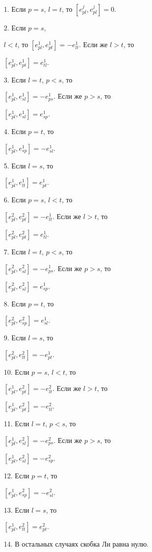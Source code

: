 \begin{itemize}


\item[1.] Если $p=s$, $l=t$, то $[e_{pl}^j,e_{pl}^j]=0$.


\item[2.] Если $p=s$,


$l<t$, то $[e_{pl}^1,e_{pt}^1]= -e_{lt}^1$. Если же $l>t$, то


$[e_{pl}^1,e_{pt}^1]=e_{tl}^1$.


\item[3.]  Если $l=t$, $p<s$, то


$[e_{pl}^1,e_{sl}^1]=-e_{ps}^1$. Если же  $p>s$, то


$[e_{pl}^1,e_{sl}^1]=e_{sp}^1$. 


\item[4.] Если $p=t$, то


$[e_{pl}^1,e_{sp}^1]=-e_{sl}^1$.


\item[5.] Если $l=s$, то


$[e_{pl}^1,e_{lt}^1]= e_{pt}^1$.


\item[6.] Если $p=s$, $l<t$, то


$[e_{pl}^2,e_{pt}^2]= -e_{lt}^1$. Если же $l>t$, то


$[e_{pl}^2,e_{pt}^2]=e_{tl}^1$.


\item[7.] Если $l=t$, $p<s$, то


$[e_{pl}^2,e_{sl}^2]=-e_{ps}^1$. Если же  $p>s$, то


$[e_{pl}^2,e_{sl}^2]=e_{sp}^1$.


\item[8.] Если $p=t$, то


$[e_{pl}^2,e_{sp}^2]=e_{sl}^1$.


\item[9.] Если $l=s$, то


$[e_{pl}^2,e_{lt}^2]= -e_{pt}^1$.


\item[10.] Если $p=s$, $l<t$, то


$[e_{pl}^1,e_{pt}^2]= -e_{lt}^2$. Если же $l>t$, то


$[e_{pl}^1,e_{pt}^2]=-e_{tl}^2$.


\item[11.] Если $l=t$, $p<s$, то


$[e_{pl}^1,e_{sl}^2]=-e_{ps}^2$. Если же  $p>s$, то


$[e_{pl}^1,e_{sl}^2]=-e_{sp}^2$.


\item[12.] Если $p=t$, то


$[e_{pl}^1,e_{sp}^2]=-e_{sl}^2$.


\item[13.] Если $l=s$, то


$[e_{pl}^1,e_{lt}^2]= e_{pt}^2$.


\item[14.] В остальных случаях скобка Ли равна нулю.


\end{itemize}






